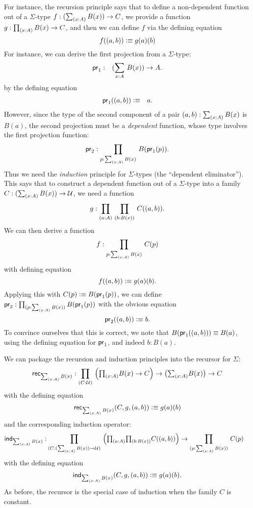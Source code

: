 For instance, the recursion principle says that to define a non-dependent function out of a $\Sigma$-type
$f : (\sm{x:A} B(x)) \to C$, we provide a function 
$g : \prd{x:A} B(x) \to C$, and then we can define $f$ via the defining
equation
\[ f((a,b)) \vcentcolon\equiv g(a)(b) \]
For instance, we can derive the first projection from a $\Sigma$-type:
\begin{eqnarray*}
  \fst & : & (\sm{x : A}B(x)) \to A.
\end{eqnarray*}
by the defining equation
\begin{eqnarray*}
  \mathsf{pr}_{1}((a,b)) & \vcentcolon\equiv & a.
\end{eqnarray*}
However, since the type of the second component of a pair $(a,b):\sm{x:A} B(x)$ is $B(a)$, the second projection must be a \emph{dependent} function, whose type involves the first projection function:
\[ \snd : \prd{p:\sm{x : A}B(x)}B(\fst(p)). \]
Thus we need the \emph{induction} principle for $\Sigma$-types (the ``dependent eliminator'').
This says that to construct a dependent function out of a $\Sigma$-type into a family $C : (\sm{x:A} B(x)) \to \UU$, we need a function
\[ g : \prd{a:A}{b:B(x)} C(\tup{a}{b}). \]
We can then derive a function 
\[ f : \prd{p : \sm{x:A}B(x)} C(p) \]
with  defining equation
\[ f((a,b)) \vcentcolon\equiv g(a)(b).\]
Applying this with $C(p)\vcentcolon\equiv B(\mathsf{pr}_{1}(p))$, we can define $\snd : \prd{p:\sm{x : A}B(x)}B(\fst(p))$ with the obvious equation
\[ \mathsf{pr}_{2}((a,b))  \vcentcolon\equiv  b. \]
To convince ourselves that this is correct, we note that $B (\mathsf{pr}_{1}((a,b))) \equiv B(a)$, using the defining equation for $\mathsf{pr}_{1}$, and
indeed $b : B(a)$.

We can package the recursion and induction principles into the recursor for $\Sigma$:
\[ \rec{\sm{x:A}B(x)} : \dprd{C:\UU}\Big(\tprd{x:A} B(x) \to C\Big) \to
\big(\tsm{x:A}B(x)\big) \to C \]
with the defining equation
\[ \rec{\sm{x:A}B(x)}(C,g,\tup{a}{b}) \defeq g(a)(b) \]
and the corresponding induction operator:
\begin{align*}
  \ind{\sm{x:A}B(x)} : & \dprd{C:(\sm{x:A} B(x)) \to \UU}
    \Big(\tprd{a:A}{b:B(x)} C(\tup{a}{b})\Big)
    \to \dprd{p : \sm{x:A}B(x)} C(p)
\end{align*}
with the defining equation 
\[ \ind{\sm{x:A}B(x)}(C,g,\tup{a}{b}) \defeq g(a)(b). \]
As before, the recursor is the special case of induction
when the family $C$ is constant.

